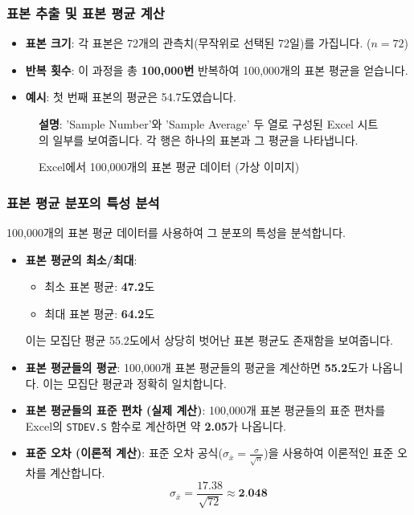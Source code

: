 \documentclass[11pt,a4paper]{article}
\theoremstyle{definition}
\begin{document}
\subsubsection*{표본 추출 및 표본 평균 계산}

\begin{itemize}
    \item \textbf{표본 크기}: 각 표본은 72개의 관측치(무작위로 선택된 72일)를 가집니다. ($n=72$)
    \item \textbf{반복 횟수}: 이 과정을 총 \textbf{100,000번} 반복하여 100,000개의 표본 평균을 얻습니다.
    \item \textbf{예시}: 첫 번째 표본의 평균은 54.7도였습니다.
\end{itemize}

\begin{figure}[h!]
    \centering
    \caption{Excel에서 100,000개의 표본 평균 데이터 (가상 이미지)}
    \label{fig:excel_samples}
    \textbf{설명}: 'Sample Number'와 'Sample Average' 두 열로 구성된 Excel 시트의 일부를 보여줍니다. 각 행은 하나의 표본과 그 평균을 나타냅니다.
\end{figure}

\subsubsection*{표본 평균 분포의 특성 분석}

100,000개의 표본 평균 데이터를 사용하여 그 분포의 특성을 분석합니다.

\begin{itemize}
    \item \textbf{표본 평균의 최소/최대}:
    \begin{itemize}
        \item 최소 표본 평균: \textbf{47.2}도
        \item 최대 표본 평균: \textbf{64.2}도
    \end{itemize}
    이는 모집단 평균 55.2도에서 상당히 벗어난 표본 평균도 존재함을 보여줍니다.
    \item \textbf{표본 평균들의 평균}: 100,000개 표본 평균들의 평균을 계산하면 \textbf{55.2}도가 나옵니다. 이는 모집단 평균과 정확히 일치합니다.
    \item \textbf{표본 평균들의 표준 편차 (실제 계산)}: 100,000개 표본 평균들의 표준 편차를 Excel의 \texttt{STDEV.S} 함수로 계산하면 약 \textbf{2.05}가 나옵니다.
    \item \textbf{표준 오차 (이론적 계산)}: 표준 오차 공식($\sigma_{\bar{x}} = \frac{\sigma}{\sqrt{n}}$)을 사용하여 이론적인 표준 오차를 계산합니다.
    \[ \sigma_{\bar{x}} = \frac{17.38}{\sqrt{72}} \approx \textbf{2.048} \]
\end{itemize}
\end{document}
